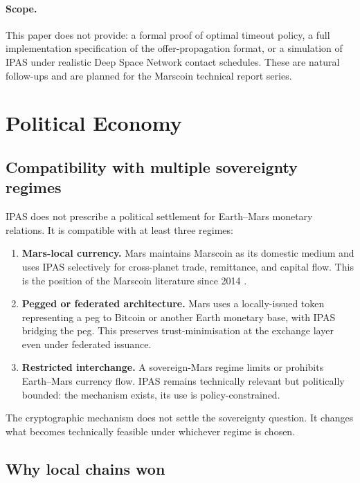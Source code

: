 \documentclass[11pt]{article}
\begin{document}
\paragraph{Scope.} This paper does not provide: a formal proof of optimal timeout policy, a full implementation specification of the offer-propagation format, or a simulation of IPAS under realistic Deep Space Network contact schedules. These are natural follow-ups and are planned for the Marscoin technical report series.

\section{Political Economy}
\label{sec:politics}

\subsection{Compatibility with multiple sovereignty regimes}

IPAS does not prescribe a political settlement for Earth--Mars monetary relations. It is compatible with at least three regimes:

\begin{enumerate}
  \item \textbf{Mars-local currency.} Mars maintains Marscoin as its domestic medium and uses IPAS selectively for cross-planet trade, remittance, and capital flow. This is the position of the Marscoin literature since 2014 \citep{lopin2014marscoin}.
  \item \textbf{Pegged or federated architecture.} Mars uses a locally-issued token representing a peg to Bitcoin or another Earth monetary base, with IPAS bridging the peg. This preserves trust-minimisation at the exchange layer even under federated issuance.
  \item \textbf{Restricted interchange.} A sovereign-Mars regime \citep{haqqmisra2024} limits or prohibits Earth--Mars currency flow. IPAS remains technically relevant but politically bounded: the mechanism exists, its use is policy-constrained.
\end{enumerate}

The cryptographic mechanism does not settle the sovereignty question. It changes what becomes technically feasible under whichever regime is chosen.

\subsection{Why local chains won}
\end{document}
